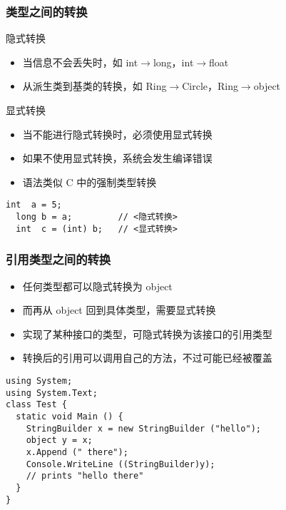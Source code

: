 \begin{frame}[fragile]
\frametitle{类型之间的转换}
\begin{block}{隐式转换}
  \begin{itemize}
  \item 当信息不会丢失时，如 int$\rightarrow$long，int$\rightarrow$float
  \item 从派生类到基类的转换，如 Ring$\rightarrow$Circle，Ring$\rightarrow$object
  \end{itemize}
\end{block}
\pause
\begin{block}{显式转换}
  \begin{itemize}
  \item 当不能进行隐式转换时，必须使用显式转换
  \item 如果不使用显式转换，系统会发生编译错误
  \item 语法类似 C 中的强制类型转换
  \end{itemize}
\end{block}
\pause
\begin{lstlisting}[escapeinside=<>]
  int  a = 5;
  long b = a;         // <隐式转换>
  int  c = (int) b;   // <显式转换>

\end{lstlisting}
\end{frame}

\begin{frame}[fragile]
\frametitle{引用类型之间的转换}
\begin{itemize}
\item 任何类型都可以隐式转换为 object
\item 而再从 object 回到具体类型，需要显式转换
\item 实现了某种接口的类型，可隐式转换为该接口的引用类型
\item 转换后的引用可以调用自己的方法，不过可能已经被覆盖
\end{itemize}
\pause
\begin{lstlisting}
using System;
using System.Text;
class Test {
  static void Main () {
    StringBuilder x = new StringBuilder ("hello");
    object y = x;
    x.Append (" there");
    Console.WriteLine ((StringBuilder)y);
    // prints "hello there"
  }
}
\end{lstlisting}
\end{frame}

